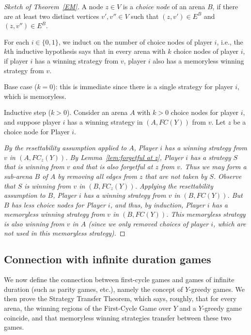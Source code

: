\documentclass[a4paper,10pt]{article}
\begin{document}
\begin{proof}[Sketch of Theorem~\ref{EM}]


A node $z \in V$ is a {\em choice node} of an arena $B$, if there are at least two distinct  vertices $v',v'' \in V$ such that $(z,v') \in E^B$ and $(z,v'') \in E^B$.

For each $i \in \{0,1\}$, we induct on the number of choice nodes of player $i$, i.e., the $k$th inductive hypothesis says that in every arena with $k$ choice nodes of player $i$, if player $i$ has a winning strategy from $v$, player $i$ also has a memoryless winning strategy from $v$.

Base case ($k = 0$): this is immediate since there is a single strategy for player $i$, which is memoryless.

Inductive step ($k > 0$). Consider an arena $A$ with $k > 0$ choice nodes for player $i$, and suppose player $i$ has a winning strategy in $(A,FC(Y))$ from $v$.  
Let $z$ be a choice node for Player $i$. 

\it
\- By the resettability assumption applied to $A$, Player $i$ has a winning strategy from $v$ in $(A,FC_z(Y))$.
\- By Lemma~\ref{lem:forgetful at z}, Player $i$ has a strategy $S$ that is winning from $v$ and that is also forgetful at $z$ from $v$. Thus we may form a sub-arena $B$ of $A$ by removing all edges from $z$ that are not taken by $S$. Observe that $S$ is winning from $v$ in $(B,FC_z(Y))$. 
\- Applying the resettability assumption to $B$, Player $i$ has a winning strategy from $v$ in $(B,FC(Y))$.
\- But $B$ has less choice nodes for Player $i$, and thus, by induction, Player $i$ has a memoryless winning strategy from $v$ in $(B,FC(Y))$. 
\ti
This memoryless strategy is also winning from $v$ in $A$ (since we only removed choices of player $i$, which are not used in this memoryless strategy).
\end{proof}



\subsection*{Connection with infinite duration games}

\cbstart
We now define the connection between first-cycle games and games of infinite duration (such as parity games, etc.), namely the concept of $Y$-greedy games. We then prove the Strategy Transfer Theorem, which says, roughly, that for every arena, the winning regions of the First-Cycle Game over $Y$ and a $Y$-greedy game coincide, and that memoryless winning strategies transfer between these two games.
\cbend
\end{document}
